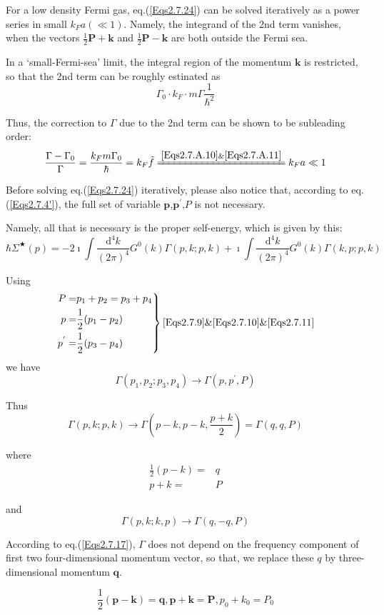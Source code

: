 For a low density Fermi gas, eq.(\ref{Eqs2.7.24}) can be solved iteratively as a power series in small $k_F a(\ll1)$. Namely, the integrand of the 2nd term vanishes, when the vectors $\frac{1}{2}\mathbf{P}+\mathbf{k}$ and $\frac{1}{2}\mathbf{P}-\mathbf{k}$ are both outside the Fermi sea.

In a `small-Fermi-sea' limit, the integral region of the momentum $\mathbf{k}$ is restricted, so that the 2nd term can be roughly estinated as
\[ \Gamma_0 \cdot k_F \cdot m \Gamma \frac{1}{\hbar^2} \]

Thus, the correction to $\Gamma$ due to the 2nd term can be shown to be subleading order:
\[ \frac{\Gamma-\Gamma_0}{\Gamma} = \frac{k_F m \Gamma_0}{\hbar} = k_F \tilde{f} \xlongequal{\ref{Eqs2.7.A.10} \& \ref{Eqs2.7.A.11}} k_F a \ll 1 \]

Before solving eq.(\ref{Eqs2.7.24}) iteratively, please also notice that, according to eq.(\ref{Eqs2.7.4'}), the full set of variable $\mathbf{p}$,$\mathbf{p}^{'}$,$P$ is not necessary.

Namely, all that is necessary is the proper self-energy, which is given by this:
\[ \hbar \Sigma^{\bigstar}(p) = -2 \imath \int \frac{\mathrm{d}^4 k}{(2\pi)^4} G^0(k)\Gamma(p,k;p,k) + \imath \int \frac{\mathrm{d}^4 k}{(2\pi)^4}G^0(k)\Gamma(k,p;p,k) \]

Using
\[ \left. \begin{split}
P =& p_1 + p_2 = p_3 + p_4\\
p =& \frac{1}{2}(p_1-p_2)\\
p^{'} =& \frac{1}{2}(p_3-p_4)
 \end{split} \right\} \ref{Eqs2.7.9} \& \ref{Eqs2.7.10} \& \ref{Eqs2.7.11} \]
we have
\[\Gamma(p_1,p_2;p_3,p_4) \rightarrow \Gamma(p,p^{'},P)\]

Thus
\[ \Gamma(p,k;p,k) \rightarrow \Gamma(p-k,p-k,\frac{p+k}{2}) = \Gamma(q,q,P) \]

where
\[ \begin{split} \frac{1}{2}(p-k) =& q\\ p+k =& P \end{split} \]

and
\[\Gamma(p,k;k,p) \rightarrow \Gamma(q,-q,P)\]

According to eq.(\ref{Eqs2.7.17}), $\Gamma$ does not depend on the frequency component of first two four-dimensional momentum vector, so that, we replace these $q$ by three-dimensional momentum $\mathbf{q}$.

\[\frac{1}{2}(\mathbf{p}-\mathbf{k})=\mathbf{q}, \mathbf{p}+\mathbf{k}=\mathbf{P},p_0+k_0=P_0
 \]

